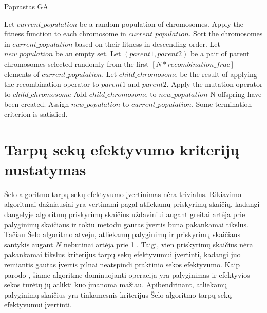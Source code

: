 \documentclass{VUMIFInfKursinis}
\begin{document}
\begin{algorithm}[H]
  \caption{Paprastas GA}\label{simple_GA}
  \begin{algorithmic}[1]
    \State Let $current\_population$ be a random population of chromosomes.\label{simple_GA:init_pop}
    \Repeat\label{simple_GA:loop_start}
      \State Apply the fitness function to each chromosome in $current\_population$.\label{simple_GA:eval_pop}
      \State Sort the chromosomes in $current\_population$ based on their fitness in descending order.
      \State Let $new\_population$ be an empty set.
      \Repeat\label{simple_GA:generate_start}
        \State Let $(parent1, parent2)$ be a pair of parent chromosomes selected randomly from the first $[N * recombination\_frac]$ elements of $current\_population$.\label{simple_GA:recomb1}
        \State Let $child\_chromosome$ be the result of applying the recombination operator to $parent1$ and $parent2$.\label{simple_GA:recomb2}
        \label{simple_GA:mut1}
          \State Apply the mutation operator to $child\_chromosome$
        \EndIf\label{simple_GA:mut2}
        \State Add $child\_chromosome$ to $new\_population$
      \Until N offspring have been created.\label{simple_GA:generate_end}
      \State Assign $new\_population$ to $current\_population$.\label{simple_GA:assign}
    \Until Some termination criterion is satisfied.\label{simple_GA:loop_end}
  \end{algorithmic}
\end{algorithm}

\section{Tarpų sekų efektyvumo kriterijų nustatymas}

Šelo algoritmo tarpų sekų efektyvumo įvertinimas nėra trivialus.
Rikiavimo algoritmai dažniausiai yra vertinami pagal atliekamų priskyrimų skaičių, kadangi
daugelyje algoritmų priskyrimų skaičius uždaviniui augant greitai artėja prie palyginimų skaičiaus ir
tokiu metodu gautas įvertis būna pakankamai tikslus.
Tačiau Šelo algoritmo atveju, atliekamų palyginimų ir priskyrimų skaičiaus santykis augant $N$ nebūtinai artėja prie 1 \cite{Radavičius_Baranauskas_2013}.
Taigi, vien priskyrimų skaičius nėra pakankamai tikslus kriterijus tarpų sekų efektyvumui įvertinti,
kadangi juo remiantis gautas įvertis pilnai neatspindi praktinio sekos efektyvumo.
Kaip parodo \cite{ciura2001best}, šiame algoritme dominuojanti operacija yra palyginimas ir efektyvios sekos
turėtų jų atlikti kuo įmanoma mažiau.
Apibendrinant, atliekamų palyginimų skaičius yra tinkamesnis kriterijus Šelo algoritmo tarpų sekų efektyvumui įvertinti.
\end{document}
